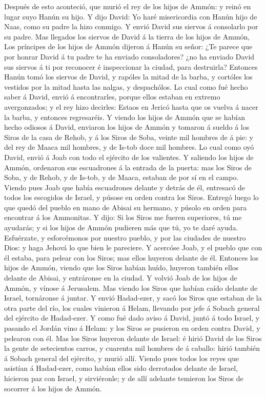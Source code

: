  Después de esto aconteció, que murió el rey de los hijos
de Ammón: y reinó en lugar suyo Hanún su hijo.  Y dijo
David: Yo haré misericordia con Hanún hijo de Naas, como su padre la
hizo conmigo. Y envió David sus siervos á consolarlo por su padre. Mas
llegados los siervos de David á la tierra de los hijos de Ammón,
 Los príncipes de los hijos de Ammón dijeron á Hanún su
señor: ¿Te parece que por honrar David á tu padre te ha enviado
consoladores? ¿no ha enviado David sus siervos á ti por reconocer é
inspeccionar la ciudad, para destruirla?  Entonces Hanún
tomó los siervos de David, y rapóles la mitad de la barba, y cortóles
los vestidos por la mitad hasta las nalgas, y despachólos.
 Lo cual como fué hecho saber á David, envió á
encontrarles, porque ellos estaban en extremo avergonzados; y el rey
hizo decirles: Estaos en Jericó hasta que os vuelva á nacer la barba, y
entonces regresaréis.  Y viendo los hijos de Ammón que se
habían hecho odiosos á David, enviaron los hijos de Ammón y tomaron á
sueldo á los Siros de la casa de Rehob, y á los Siros de Soba, veinte
mil hombres de á pie: y del rey de Maaca mil hombres, y de Is-tob doce
mil hombres.  Lo cual como oyó David, envió á Joab con
todo el ejército de los valientes.  Y saliendo los hijos
de Ammón, ordenaron sus escuadrones á la entrada de la puerta: mas los
Siros de Soba, y de Rehob, y de Is-tob, y de Maaca, estaban de por sí en
el campo.  Viendo pues Joab que había escuadrones delante
y detrás de él, entresacó de todos los escogidos de Israel, y púsose en
orden contra los Siros.  Entregó luego lo que quedó del
pueblo en mano de Abisai su hermano, y púsolo en orden para encontrar á
los Ammonitas.  Y dijo: Si los Siros me fueren
superiores, tú me ayudarás; y si los hijos de Ammón pudieren más que tú,
yo te daré ayuda.  Esfuérzate, y esforcémonos por nuestro
pueblo, y por las ciudades de nuestro Dios: y haga Jehová lo que bien le
pareciere.  Y acercóse Joab, y el pueblo que con él
estaba, para pelear con los Siros; mas ellos huyeron delante de él.
 Entonces los hijos de Ammón, viendo que los Siros habían
huído, huyeron también ellos delante de Abisai, y entráronse en la
ciudad. Y volvió Joab de los hijos de Ammón, y vínose á Jerusalem.
 Mas viendo los Siros que habían caído delante de Israel,
tornáronse á juntar.  Y envió Hadad-ezer, y sacó los
Siros que estaban de la otra parte del río, los cuales vinieron á Helam,
llevando por jefe á Sobach general del ejército de Hadad-ezer.
 Y como fué dado aviso á David, juntó á todo Israel, y
pasando el Jordán vino á Helam: y los Siros se pusieron en orden contra
David, y pelearon con él.  Mas los Siros huyeron delante
de Israel: é hirió David de los Siros la gente de setecientos carros, y
cuarenta mil hombres de á caballo: hirió también á Sobach general del
ejército, y murió allí.  Viendo pues todos los reyes que
asistían á Hadad-ezer, como habían ellos sido derrotados delante de
Israel, hicieron paz con Israel, y sirviéronle; y de allí adelante
temieron los Siros de socorrer á los hijos de Ammón.


